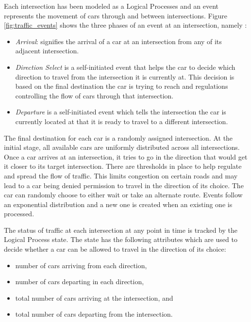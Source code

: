 \documentclass[11pt]{book}
\begin{document}
\noindent
Each intersection has been modeled as a Logical Processes and an event represents the movement
of cars through and between intersections.  Figure \ref{fig:traffic_events} shows the three
phases of an event at an intersection, namely :

\begin{itemize}
\item \emph{Arrival}: signifies the arrival of a car at an intersection from any of its adjacent intersection.
\item \emph{Direction Select} is a self-initiated event that helps the car to decide which direction to travel
  from the intersection it is currently at. This decision is based on the final destination the car is trying
  to reach and regulations controlling the flow of cars through that intersection.
\item \emph{Departure} is a self-initiated event which tells the intersection the car is currently located at
  that it is ready to travel to a different intersection.
\end{itemize}

The final destination for each car is a randomly assigned intersection.  At the initial stage, all available
cars are uniformly distributed across all intersections.  Once a car arrives at an intersection, it tries to
go in the direction that would get it closer to its target intersection.  There are thresholds in place to
help regulate and spread the flow of traffic.  This limits congestion on certain roads and may lead to a car
being denied permission to travel in the direction of its choice.  The car can randomly choose to either wait
or take an alternate route.  Events follow an exponential distribution and a new one is created when an
existing one is processed.

The status of traffic at each intersection at any point in time is tracked by the Logical Process state.  The
state has the following attributes which are used to decide whether a car can be allowed to travel in the
direction of its choice:

\begin{itemize}
\item number of cars arriving from each direction,
\item number of cars departing in each direction,
\item total number of cars arriving at the intersection, and
\item total number of cars departing from the intersection.
\end{itemize}
\end{document}
